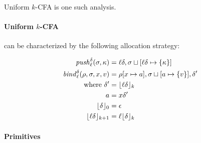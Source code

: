 \documentclass[preprint,onecolumn,9pt]{sigplanconf} %
\begin{document}
Uniform \(k\)-CFA is one such analysis.

\paragraph{Uniform \(k\)-CFA} can be characterized by the following allocation
strategy:

\begin{align*}
\mathit{push}_{\ell}^{\delta}(\sigma,\kappa) &=
  {\ell}{\delta},\sigma\sqcup[{\ell}{\delta}\mapsto\{\kappa\}] \\
\mathit{bind}^{\delta}_{\ell}(\rho,\sigma,x,v) &= \rho[x \mapsto a],
                                           \sigma\sqcup[a \mapsto
                                             \{ v\}],
                                           {\delta}' \\
\mbox{where } {\delta}' &= \lfloor{\ell}{\delta}\rfloor_k \\
              a &= x{\delta}' \\
              \lfloor {\delta} \rfloor_0 &= {\epsilon} \\
              \lfloor {\ell}{\delta} \rfloor_{k+1} &= {\ell}\lfloor {\delta}\rfloor_k
\end{align*}



\paragraph{Primitives}



\end{document}
